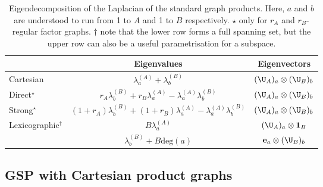 \begin{table}[h]
    \def\arraystretch{1.8}
    \centering
    \small
    \vspace{0.5cm}
    \begin{tabular}{|l|cc|}
        \hline 
    
        & Eigenvalues
        & Eigenvectors \\
    
        \hline
    
        Cartesian 
        & $\lambda_a^{(A)} + \lambda_b^{(B)}$ 
        & $(\U_A)_a \otimes (\U_B)_b$ \\
    
        Direct$^{\star}$
        & $r_A \lambda_b^{(B)} + r_B \lambda_a^{(A)} - \lambda_a^{(A)} \lambda_b^{(B)}$  
        & $(\U_A)_a \otimes (\U_B)_b$ \\
        
        Strong$^{\star}$
        & $(1+r_A) \lambda_b^{(B)} + (1+r_B) \lambda_a ^{(A)}- \lambda_a^{(A)} \lambda_b^{(B)}$
        & $(\U_A)_a \otimes (\U_B)_b$ \\
    
        \multirow{2}{7em}{Lexicographic$^\dagger$}
        & $B \lambda_a^{(A)}$ 
        & $(\U_A)_a \otimes \mathbf{1}_B$ \\

        & $\lambda_b^{(B)} + B \text{deg}(a)$ 
        & $\mathbf{e}_a \otimes (\U_B)_b$  \\
    
        \hline
    
    \end{tabular}
    \vspace{0.2cm}
    \caption[Spectral decomposition of product graphs]{Eigendecomposition of the Laplacian of the standard graph products. Here, $a$ and $b$ are understood to run from 1 to $A$ and 1 to $B$ respectively. $\star$ only for $r_A$ and $r_B$-regular factor graphs. $\dagger$ note that the lower row forms a full spanning set, but the upper row can also be a useful parametrisation for a subspace. } 
    \vspace{0.3cm}
    \label{tab:product_graph_spectra}
    \end{table}
    


\subsection{GSP with Cartesian product graphs} 

